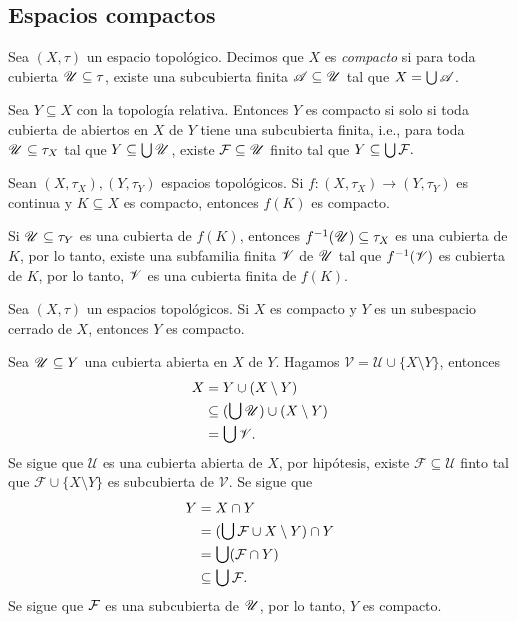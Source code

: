 \subsection{Espacios compactos}
\begin{definicion}
    Sea $(X,\tau)$ un espacio topológico. Decimos que $X$ es \textit{compacto} si para toda cubierta $\mathscr{U}\subseteq \tau$, existe una subcubierta finita $\mathscr{A}\subseteq\mathscr{U}$ tal que $X=\bigcup\mathscr{A}$.
\end{definicion}
\begin{obs}
    Sea $Y\subseteq X$ con la topología relativa. Entonces $Y$ es compacto si solo si toda cubierta de abiertos en $X$ de $Y$ tiene una subcubierta finita, i.e., para toda $\mathscr{U}\subseteq \tau_X$ tal que $Y\subseteq\bigcup\mathscr{U}$, existe $\mathcal{F}\subseteq \mathscr{U}$ finito tal que $Y\subseteq\bigcup \mathcal{F}.$
\end{obs}
\begin{prop}
\label{prop:f(K)_compacto}
    Sean $(X,\tau_X),(Y,\tau_Y)$ espacios topológicos. Si $f:(X,\tau_X)\to(Y,\tau_Y)$ es continua y $K\subseteq X$ es compacto, entonces $f(K)$ es compacto.
\end{prop}
\begin{dem}
    Si $\mathscr{U}\subseteq\tau_Y$ es una cubierta de $f(K)$, entonces $f^{-1}(\mathscr{U})\subseteq \tau_X$ es una cubierta de $K$, por lo tanto, existe una subfamilia finita $\mathscr{V}$ de $\mathscr{U}$ tal que $f^{-1}(\mathscr{V})$ es cubierta de $K$, por lo tanto, $\mathscr{V}$ es una cubierta finita de $f(K)$.
\end{dem}
\begin{prop}
\label{prop:cerrado_de_compacto}
    Sea $(X,\tau)$ un espacios topológicos. Si $X$ es compacto y $Y$ es un subespacio cerrado de $X$, entonces $Y$ es compacto.
\end{prop}
\begin{dem}
    Sea $\mathscr{U}\subseteq Y$ una cubierta abierta en $X$ de $Y$. Hagamos $\mathscr{V}=\mathscr{U}\cup\{X\setminus Y\}$, entonces
    \begin{align*}
        X&=Y\cup (X\setminus Y)\\
        &\subseteq(\medcup\mathscr{U})\cup (X\setminus Y)\\
        &=\medcup\mathscr{V}.
    \end{align*}
    Se sigue que $\mathscr{U}$ es una cubierta abierta de $X$, por hipótesis, existe $\mathcal{F}\subseteq \mathscr{U}$ finto tal que $\mathcal{F}\cup\{X\setminus Y\}$ es subcubierta de $\mathscr{V}$.
    Se sigue que
    \begin{equation*}
        \begin{split}
            Y&=X\cap Y\\
            &=\textstyle (\medcup\mathcal{F}\cup X\setminus Y)\cap Y\\
            &=\textstyle\medcup(\mathcal{F}\cap Y)\\
            &\subseteq\textstyle\medcup\mathcal{F}.
        \end{split}
    \end{equation*}
    Se sigue que $\mathcal{F}$ es una subcubierta de $\mathscr{U}$, por lo tanto, $Y$ es compacto.
\end{dem}

